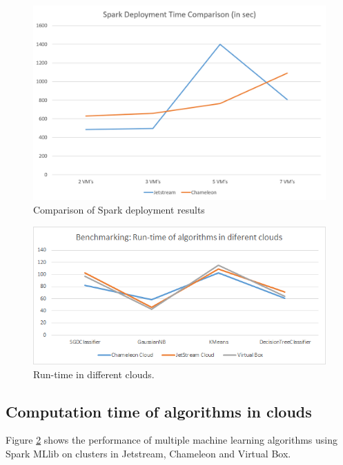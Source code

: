 \documentclass[9pt,twocolumn,twoside]{../../styles/osajnl}
\begin{document}
\begin{figure}[h]
	\centering
	\includegraphics[width=\linewidth,scale=1]{images/finalspdeployment.png}
	\caption{Comparison of Spark deployment results}
	\label{fig:spd}
\end{figure}

\begin{figure}[h]
	\centering
	\includegraphics[scale=0.85]{images/Benchmarking}
	\caption{Run-time in different clouds.}
	\label{fig:bench}
\end{figure}

\subsection{Computation time of algorithms in clouds}
Figure \ref{fig:bench} shows the performance of multiple machine learning algorithms using Spark MLlib on clusters in Jetstream, Chameleon and Virtual Box.
\end{document}
